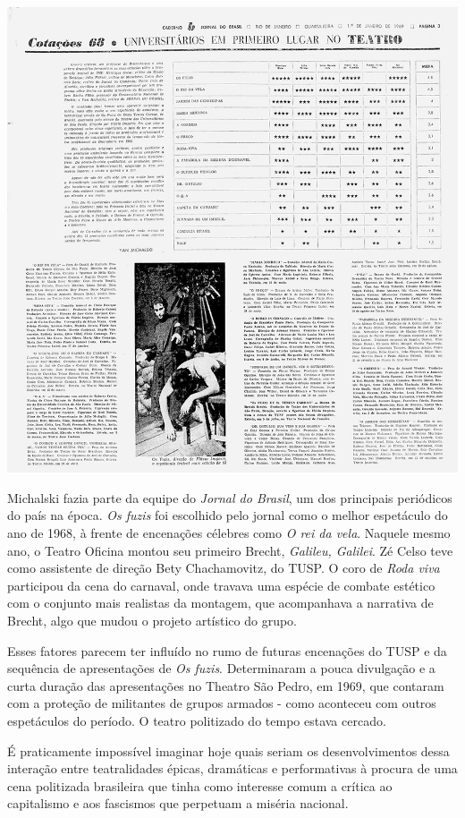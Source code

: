\includegraphics[width=\columnwidth]{./media/IMAGEM61.jpg}

Michalski fazia parte da equipe do \textit{Jornal do Brasil}, um dos
principais periódicos do país na época. \textit{Os fuzis} foi escolhido
pelo jornal como o melhor espetáculo do ano de 1968, à frente de
encenações célebres como \textit{O rei da vela}. Naquele mesmo ano, o
Teatro Oficina montou seu primeiro Brecht, \textit{Galileu, Galilei}. Zé
Celso teve como assistente de direção Bety Chachamovitz, do TUSP. O coro
de \textit{Roda viva} participou da cena do carnaval, onde travava uma
espécie de combate estético com o conjunto mais realistas da montagem,
que acompanhava a narrativa de Brecht, algo que mudou o projeto
artístico do grupo.

Esses fatores parecem ter influído no rumo de futuras encenações do TUSP
e da sequência de apresentações de \textit{Os fuzis}. Determinaram a pouca
divulgação e a curta duração das apresentações no Theatro São Pedro, em
1969, que contaram com a proteção de militantes de grupos armados - como
aconteceu com outros espetáculos do período. O teatro politizado do
tempo estava cercado.

É praticamente impossível imaginar hoje quais seriam os desenvolvimentos
dessa interação entre teatralidades épicas, dramáticas e performativas à
procura de uma cena politizada brasileira que tinha como interesse comum
a crítica ao capitalismo e aos fascismos que perpetuam a miséria
nacional.

